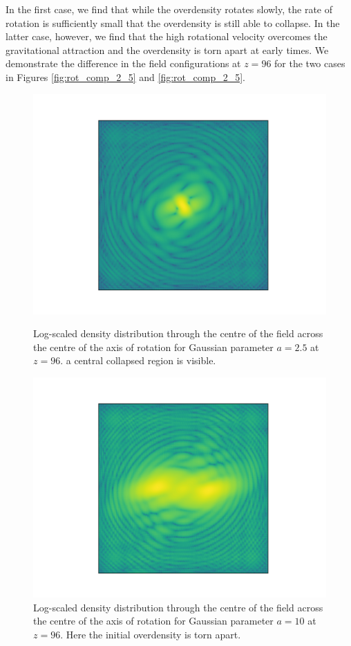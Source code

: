 \documentclass[a4paper,11pt]{article}
\begin{document}
In the first case, we find that while the overdensity rotates slowly, the rate of rotation is sufficiently small that the overdensity is still able to collapse. In the latter case, however, we find that the high rotational velocity overcomes the gravitational attraction and the overdensity is torn apart at early times. We demonstrate the difference in the field configurations at $z=96$ for the two cases in Figures \ref{fig:rot_comp_2_5} and \ref{fig:rot_comp_2_5}.

\begin{figure}[!htb]
  \includegraphics[trim={2cm 0 1cm 0cm},scale=0.55]{rot_comp_2_5.png}
  \caption{Log-scaled density distribution through the centre of the field across the centre of the axis of rotation for Gaussian parameter $a = 2.5$ at $z=96$. a central collapsed region is visible.}\label{fig:rot_comp_2_5}
\endminipage\hfill
{}
  \includegraphics[trim={2cm 0 1cm 0cm},scale=0.55]{rot_comp_10.png}
  \caption{Log-scaled density distribution through the centre of the field across the centre of the axis of rotation for Gaussian parameter $a = 10$ at $z=96$. Here the initial overdensity is torn apart.}\label{fig:rot_comp_10}
\endminipage\hfill
\end{figure}
\end{document}

